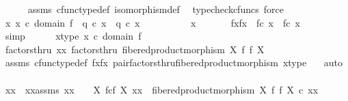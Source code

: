 \begin{isabellebody}
\ \ \ \ \isamarkupfalse%
\ assms{\isacharparenleft}{\kern0pt}{}{\isacharcomma}{\kern0pt}{}{\isacharparenright}{\kern0pt}\ cfunc{\isacharunderscore}{\kern0pt}type{\isacharunderscore}{\kern0pt}def\ isomorphism{\isacharunderscore}{\kern0pt}def\ \isamarkupfalse%
\ {\isacharparenleft}{\kern0pt}typecheck{\isacharunderscore}{\kern0pt}cfuncs{\isacharcomma}{\kern0pt}\ force{\isacharparenright}{\kern0pt}\isanewline
\isanewline
\ \ \isamarkupfalse%
\ {\isachardoublequoteopen}{\isasymAnd}x{\isachardot}{\kern0pt}\ x\ {\isasymin}\isactrlsub c\ domain\ f\ {\isasymLongrightarrow}\ q{}\ {\isasymcirc}\isactrlsub c\ x\ {\isacharequal}{\kern0pt}\ q{}\ {\isasymcirc}\isactrlsub c\ x{\isachardoublequoteclose}\isanewline
\ \ \isamarkupfalse%
\ {\isacharminus}{\kern0pt}\isanewline
\ \ \ \ \isamarkupfalse%
\ x\ \isanewline
\ \ \ \ \isamarkupfalse%
\ fxfx{\isacharcolon}{\kern0pt}\ \ {\isachardoublequoteopen}f{\isasymcirc}\isactrlsub c\ x\ {\isacharequal}{\kern0pt}\ f{\isasymcirc}\isactrlsub c\ x{\isachardoublequoteclose}\isanewline
\ \ \ \ \ \ \ \isamarkupfalse%
\ simp\isanewline
\ \ \ \ \isamarkupfalse%
\ x{\isacharunderscore}{\kern0pt}type{\isacharcolon}{\kern0pt}\ {\isachardoublequoteopen}x\ {\isasymin}\isactrlsub c\ domain\ f{\isachardoublequoteclose}\isanewline
\ \ \ \ \isamarkupfalse%
\ factorsthru{\isacharcolon}{\kern0pt}\ {\isachardoublequoteopen}{\isasymlangle}x{\isacharcomma}{\kern0pt}x{\isasymrangle}\ factorsthru\ fibered{\isacharunderscore}{\kern0pt}product{\isacharunderscore}{\kern0pt}morphism\ X\ f\ f\ X{\isachardoublequoteclose}\isanewline
\ \ \ \ \ \ \isamarkupfalse%
\ assms{\isacharparenleft}{\kern0pt}{}{\isacharparenright}{\kern0pt}\ cfunc{\isacharunderscore}{\kern0pt}type{\isacharunderscore}{\kern0pt}def\ fxfx\ pair{\isacharunderscore}{\kern0pt}factorsthru{\isacharunderscore}{\kern0pt}fibered{\isacharunderscore}{\kern0pt}product{\isacharunderscore}{\kern0pt}morphism\ x{\isacharunderscore}{\kern0pt}type\ \ \isamarkupfalse%
\ auto\isanewline
\ \ \ \ \isamarkupfalse%
\ \isamarkupfalse%
\ xx\ \ xx{\isacharunderscore}{\kern0pt}assms{\isacharcolon}{\kern0pt}\ {\isachardoublequoteopen}xx\ {\isacharcolon}{\kern0pt}\ {\isasymone}\ {\isasymrightarrow}\ X\ \isactrlbsub f\isactrlesub {\isasymtimes}\isactrlsub c\isactrlbsub f\isactrlesub \ X{\isachardoublequoteclose}\ {\isachardoublequoteopen}{\isasymlangle}x{\isacharcomma}{\kern0pt}x{\isasymrangle}\ {\isacharequal}{\kern0pt}\ fibered{\isacharunderscore}{\kern0pt}product{\isacharunderscore}{\kern0pt}morphism\ X\ f\ f\ X\ {\isasymcirc}\isactrlsub c\ xx{\isachardoublequoteclose}\isanewline

\end{isabellebody}
